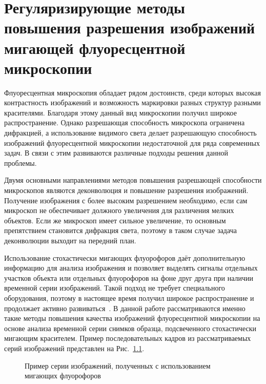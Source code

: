 \chapter{Регуляризирующие методы повышения разрешения изображений мигающей флуоресцентной микроскопии}\label{ch:ch1}

Флуоресцентная микроскопия обладает рядом достоинств, среди которых высокая контрастность изображений и возможность маркировки разных структур разными красителями. Благодаря этому данный вид микроскопии получил широкое распространение. Однако разрешающая способность микроскопа ограничена дифракцией, а использование видимого света делает разрешающую способность изображений флуоресцентной микроскопии недостаточной для ряда современных задач. В связи с этим развиваются различные подходы решения данной проблемы.

Двумя основными направлениями методов повышения разрешающей способности микроскопов являются деконволюция и повышение разрешения изображений. Получение изображения с более высоким разрешением необходимо, если сам микроскоп не обеспечивает должного увеличения для различения мелких объектов. Если же микроскоп имеет сильное увеличение, то основным препятствием становится дифракция света, поэтому в таком случае задача деконволюции выходит на передний план.

Использование стохастически мигающих флуорофоров даёт дополнительную информацию для анализа изображения и позволяет выделять сигналы отдельных участков объекта или отдельных флуорофоров на фоне друг друга при наличии временной серии изображений. Такой подход не требует специального оборудования, поэтому в настоящее время получил широкое распространение и продолжает активно развиваться~\cite{мишин2019флуоресцентная}. В данной работе рассматриваются именно такие методы повышения качества изображений флуоресцентной микроскопии на основе анализа временной серии снимков образца, подсвеченного стохастически мигающим красителем. Пример последовательных кадров из рассматриваемых серий изображений представлен на Рис.~\ref{fig:blinking-samples}.

\begin{figure}[ht]
	\caption{Пример серии изображений, полученных с использованием мигающих флуорофоров}
	\label{fig:blinking-samples}
\end{figure}

